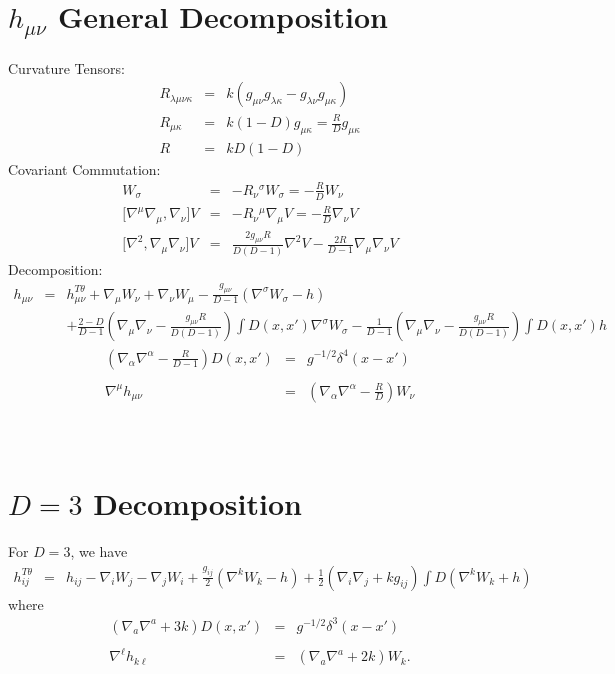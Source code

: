 \documentclass[10pt,letterpaper]{article}
\numberwithin{equation}{section}
\begin{document}
\section{$h_{\mu\nu}$ General Decomposition}
Curvature Tensors:
\begin{eqnarray}
R_{\lambda\mu\nu\kappa} &=& k(g_{\mu\nu}g_{\lambda\kappa}-g_{\lambda\nu}g_{\mu\kappa})
\nonumber\\
R_{\mu\kappa} &=& k(1-D)g_{\mu\kappa} = \frac{R}{D}g_{\mu\kappa}
\nonumber\\
R&=& kD(1-D) 
\end{eqnarray}
Covariant Commutation:
\begin{eqnarray}
[\nabla^\sigma \nabla_\nu] W_\sigma &=& -R_{\nu}{}^\sigma W_\sigma = -\frac{R}{D}W_\nu
\nonumber\\
{[}\nabla^\mu \nabla_\mu, \nabla_\nu] V &=& -R_{\nu}{}^\mu \nabla_\mu V = -\frac{R}{D}\nabla_\nu V
\nonumber\\
{[}\nabla^2,\nabla_\mu\nabla_\nu]V &=& \frac{2 g_{\mu\nu}R}{D(D-1)}\nabla^2 V - \frac{2R}{D-1}\nabla_\mu\nabla_\nu V
\label{comms}
\end{eqnarray}
Decomposition:
\begin{eqnarray}
h_{\mu\nu} &=& h_{\mu\nu}^{T\theta} + \nabla_\mu W_\nu + \nabla_\nu W_\mu - \frac{g_{\mu\nu}}{D-1}(\nabla^\sigma W_\sigma - h)
\nonumber\\
&& +\frac{2-D}{D-1}\left( \nabla_\mu\nabla_\nu -\frac{ g_{\mu\nu}R}{D(D-1)}\right) \int D(x,x') \nabla^\sigma W_\sigma
-\frac{1}{D-1}\left( \nabla_\mu\nabla_\nu -\frac{g_{\mu\nu}R}{D(D-1)}\right) \int D(x,x') h
\label{decomph}
\end{eqnarray}
\begin{eqnarray}
\left( \nabla_\alpha \nabla^\alpha - \frac{R}{D-1}\right)D(x,x') &=& g^{-1/2}\delta^4 (x-x')
\nonumber\\ \nonumber\\
\nabla^\mu h_{\mu\nu} &=& \left( \nabla_\alpha\nabla^\alpha-\frac{R}{D} \right) W_\nu
\end{eqnarray}
\\ \\
\section{$D=3$ Decomposition}
For $D=3$, we have
\begin{eqnarray}
h_{ij}^{T\theta} &=& h_{ij} - \nabla_i W_j - \nabla_j W_i + \frac{g_{ij}}{2}(\nabla^k W_k - h) +\frac{1}{2}(\nabla_i\nabla_j +kg_{ij})\int D (\nabla^k W_k+h)
\label{htt}
\end{eqnarray}
where 
\begin{eqnarray}
\left( \nabla_a \nabla^a+ 3k \right)D(x,x') &=& g^{-1/2}\delta^3 (x-x')
\nonumber\\ \nonumber\\
\nabla^\ell h_{k\ell} &=& \left( \nabla_a\nabla^a+2k \right) W_k.
\end{eqnarray}
\end{document}
